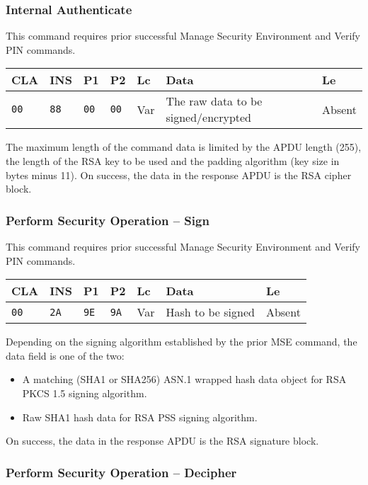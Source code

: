 \documentclass{article}
\begin{document}
\subsubsection{Internal Authenticate}

This command requires prior successful Manage Security Environment and
Verify PIN commands.
\begin{flushleft}
\begin{tabular}{|l|l|l|l|l|l|l|}
\hline
CLA & INS & P1 & P2 & Lc & Data & Le \\
\hline
\texttt{00} & \texttt{88} & \texttt{00} & \texttt{00} &
Var & The raw data to be signed\slash encrypted & Absent \\
\hline
\end{tabular}
\end{flushleft}
The maximum length of the command data is limited by the APDU length
(255), the length of the RSA key to be used and the padding algorithm
(key size in bytes minus 11). On success, the data in the response
APDU is the RSA cipher block.

\subsubsection{Perform Security Operation -- Sign}

This command requires prior successful Manage Security Environment and
Verify PIN commands.
\begin{flushleft}
\begin{tabular}{|l|l|l|l|l|l|l|}
\hline
CLA & INS & P1 & P2 & Lc & Data & Le \\
\hline
\texttt{00} & \texttt{2A} & \texttt{9E} & \texttt{9A} &
Var & Hash to be signed & Absent \\
\hline
\end{tabular}
\end{flushleft}
Depending on the signing algorithm established by the prior MSE
command, the data field is one of the two:
\begin{itemize}
  \item A matching (SHA1 or SHA256) ASN.1 wrapped hash data object for
    RSA PKCS 1.5 signing algorithm.
  \item Raw SHA1 hash data for RSA PSS signing algorithm.
\end{itemize}
On success, the data in the response APDU is the RSA signature block.

\subsubsection{Perform Security Operation -- Decipher}
\end{document}
